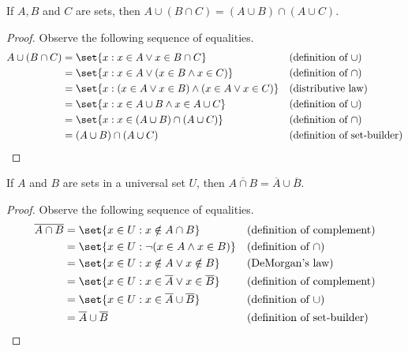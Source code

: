 \documentclass[DIN, pagenumber=false, fontsize=11pt, parskip=half]{scrartcl}
\begin{document}
\begin{problems}
    \problem If $A,B$ and $C$ are sets, then $A \cup (B \cap C) = (A \cup B) \cap (A \cup C)$.
    \begin{proof}
        Observe the following sequence of equalities.
        \begin{align*}
            A \cup (B \cap C) & = \set{x : x \in A \lor x \in B \cap C} && \text{(definition of $\cup$)}\\
                        & = \set{x : x \in A \lor (x \in B \land x \in C)} && \text{(definition of $\cap$)}\\
                        & = \set{x : (x \in A \lor x \in B) \land (x \in A \lor x \in C)} && \text{(distributive law)}\\
                        & = \set{x : x \in A \cup B \land x \in A \cup C} && \text{(definition of $\cup$)}\\
                        & = \set{x : x \in (A \cup B) \cap (A \cup C)} && \text{(definition of $\cap$)}\\
                        & = (A \cup B) \cap (A \cup C) && \text{(definition of set-builder)}
        \end{align*}
    \end{proof}

    \problem If $A$ and $B$ are sets in a universal set $U$, then $\overline{A \cap B} = \overline{A} \cup \overline{B}$.
    \begin{proof}
        Observe the following sequence of equalities.
        \begin{align*}
            \overline{A \cap B} & = \set{x \in U : x \notin A \cap B} && \text{(definition of complement)}\\
                                & = \set{x \in U : \neg(x \in A \land x \in B)} && \text{(definition of $\cap$)}\\
                                & = \set{x \in U : x \notin A \lor x \notin B} && \text{(DeMorgan's law)}\\
                                & = \set{x \in U : x \in \overline{A} \lor x \in \overline{B}} && \text{(definition of complement)}\\
                                & = \set{x \in U : x \in \overline{A} \cup \overline{B}} && \text{(definition of $\cup$)}\\
                                & = \overline{A} \cup \overline{B} && \text{(definition of set-builder)}
        \end{align*}
    \end{proof}


\end{problems}
\end{document}

